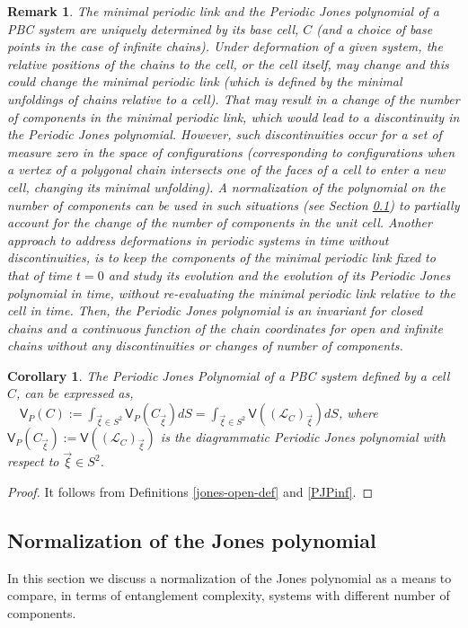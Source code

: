 \documentclass{article}
\newtheorem{corollary}{Corollary}[section]
\newtheorem{remark}{Remark}[section]
\begin{document}
\begin{remark}\label{ae}
The minimal periodic link and the Periodic Jones polynomial of a PBC system are uniquely determined by its base cell, $C$ (and a choice of base points in the case of infinite chains). Under deformation of a given system, the relative positions of the chains to the cell, or the cell itself, may change and this could change the minimal periodic link (which is defined by the minimal unfoldings of chains relative to a cell). That may result in a change of the number of components in the minimal periodic link, which would lead to a discontinuity in the Periodic Jones polynomial. However, such discontinuities occur for a set of measure zero in the space of configurations (corresponding to configurations when a vertex of a polygonal chain intersects one of the faces of a cell to enter a new cell, changing its minimal unfolding). A normalization of the polynomial on the number of components can be used in such situations (see Section \ref{modulo}) to partially account for the change of the number of components in the unit cell. Another approach to address deformations in periodic systems in time without discontinuities, is to keep the components of the minimal periodic link fixed to that of time $t=0$ and study its evolution and the evolution of its Periodic Jones polynomial in time, without re-evaluating the minimal periodic link relative to the cell in time. Then, the Periodic Jones polynomial is an invariant for closed chains and a continuous function of the chain coordinates for open and infinite chains without any discontinuities or changes of number of components.
\end{remark}

\begin{corollary} The Periodic Jones Polynomial of a PBC system defined by a cell $C$, can be expressed as,
$\quad \displaystyle \mathsf{V}_P(C) :=  \int_{\vec{\xi}\in S^2} \mathsf{V}_P(C_{\vec{\xi}})dS =  \int_{\vec{\xi}\in S^2} \mathsf{V}\left((\mathcal{L}_C)_{\vec{\xi}}\right)dS$, \quad
where $\displaystyle \mathsf{V}_{P}(C_{\vec{\xi}}):=\mathsf{V}\left((\mathcal{L}_C)_{\vec{\xi}}\right)$ is the diagrammatic Periodic Jones polynomial with respect to $\vec{\xi}\in S^2$.
\end{corollary}
\begin{proof}
    It follows from  Definitions \ref{jones-open-def} and \ref{PJPinf}.
\end{proof}

\subsection{Normalization of the Jones polynomial}
\label{modulo}
In this section we discuss a normalization of the Jones polynomial as a means to
compare, in terms of entanglement complexity, systems with different number of components.
\end{document}
